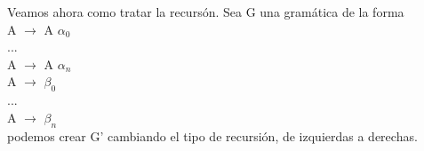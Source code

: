 \documentclass[\main/ApuntesPL.tex]{subfiles}
\begin{document}
      \bigskip
      \par
      Veamos ahora como tratar la recursón. Sea G una gramática de la forma\\
      \hspace{5mm}A $\rightarrow$ {\color{red}A} $\alpha_0$\\
      \hspace{5mm}...\\
      \hspace{5mm}A $\rightarrow$ {\color{red}A} $\alpha_n$\\
      \hspace{5mm}A $\rightarrow$ $\beta_0$\\
      \hspace{5mm}...\\
      \hspace{5mm}A $\rightarrow$ $\beta_n$\\
      podemos crear G' cambiando el tipo de recursión, de izquierdas a derechas.\\
\end{document}

